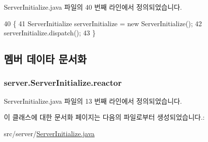 Server\-Initialize.\-java 파일의 40 번째 라인에서 정의되었습니다.


\begin{DoxyCode}
40                                            \{
41         ServerInitialize serverInitialize = \textcolor{keyword}{new} ServerInitialize();
42         serverInitialize.dispatch();
43     \}
\end{DoxyCode}


\subsection{멤버 데이타 문서화}
\hypertarget{classserver_1_1_server_initialize_a16faf593fd3a106821a301c4d5089ee5}{
\subsubsection[{reactor}]{ server.\-Server\-Initialize.\-reactor\hspace{0.3cm}{\ttfamily [private]}}}\label{classserver_1_1_server_initialize_a16faf593fd3a106821a301c4d5089ee5}


Server\-Initialize.\-java 파일의 13 번째 라인에서 정의되었습니다.



이 클래스에 대한 문서화 페이지는 다음의 파일로부터 생성되었습니다.\-:\begin{DoxyCompactItemize}
\item 
src/server/\hyperlink{_server_initialize_8java}{Server\-Initialize.\-java}\end{DoxyCompactItemize}
